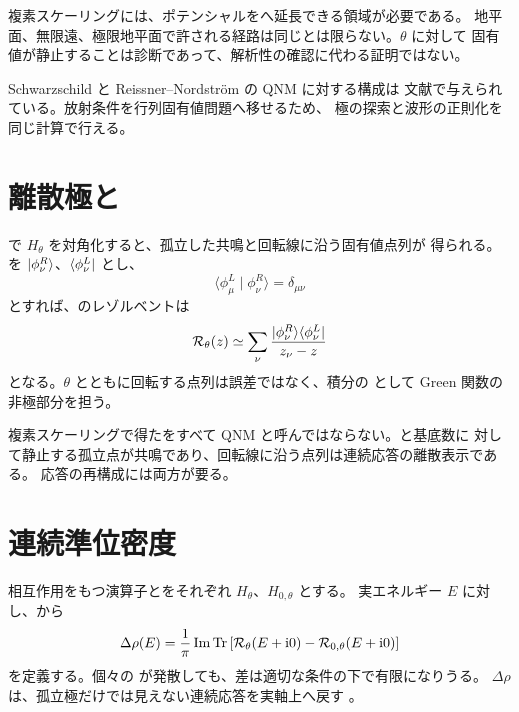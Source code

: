 \begin{warningbox}
複素スケーリングには、ポテンシャルをへ延長できる領域が必要である。
地平面、無限遠、極限地平面で許される経路は同じとは限らない。$\theta$ に対して
固有値が静止することは診断であって、解析性の確認に代わる証明ではない。
\end{warningbox}

Schwarzschild と Reissner--Nordstr\"om の QNM に対する構成は
文献\cite{Ogawa:2026veu}で与えられている。放射条件を行列固有値問題へ移せるため、
極の探索と波形の正則化を同じ計算で行える。

\section{離散極と}

で $H_\theta$ を対角化すると、孤立した共鳴と回転線に沿う固有値点列が
得られる。を $\lvert \phi^R_\nu \rangle$、$\langle \phi^L_\nu \rvert$ とし、
\begin{equation}
\langle\phi^L_\mu\mid\phi^R_\nu\rangle
=
\delta_{\mu\nu}
\end{equation}
とすれば、のレゾルベントは
\begin{equation}
\mathcal{R}_\theta(z)
\simeq
\sum_\nu
\frac{
\lvert \phi^R_\nu \rangle\langle \phi^L_\nu \rvert
}{
z_\nu-z
}
\label{eq:csm-finite-resolvent}
\end{equation}
となる。$\theta$ とともに回転する点列は誤差ではなく、積分の
として Green 関数の非極部分を担う。

\begin{principlebox}
複素スケーリングで得たをすべて QNM と呼んではならない。と基底数に
対して静止する孤立点が共鳴であり、回転線に沿う点列は連続応答の離散表示である。
応答の再構成には両方が要る。
\end{principlebox}

\section{連続準位密度}

相互作用をもつ演算子とをそれぞれ $H_\theta$、$H_{0,\theta}$ とする。
実エネルギー $E$ に対し、から
\begin{equation}
\Delta\rho(E)
=
\frac{1}{\pi}
\operatorname{Im}\operatorname{Tr}\left[
\mathcal{R}_\theta(E+\mathrm{i}0)
-\mathcal{R}_{0,\theta}(E+\mathrm{i}0)
\right]
\label{eq:continuum-level-density}
\end{equation}
を定義する。個々の  が発散しても、差は適切な条件の下で有限になりうる。
$\Delta\rho$ は、孤立極だけでは見えない連続応答を実軸上へ戻す
\cite{Suzuki:2005wv}。

